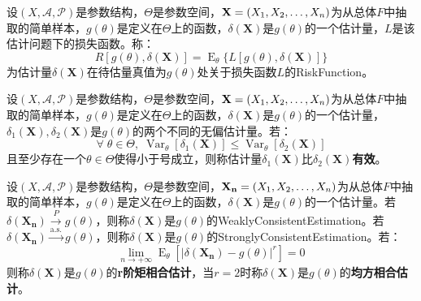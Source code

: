\begin{definition}
	设$(X,\mathscr{A},\mathscr{P})$是参数结构，$\Theta$是参数空间，$\mathbf{X}=(X_1, X_2, \dots, X_{n})$为从总体$F$中抽取的简单样本，$g(\theta)$是定义在$\Theta$上的函数，$\delta(\mathbf{X})$是$g(\theta)$的一个估计量，$L$是该估计问题下的损失函数。称：
	\begin{equation*}
		R[g(\theta),\delta(\mathbf{X})]=\operatorname{E}_{\theta}\{L[g(\theta),\delta(\mathbf{X})]\}
	\end{equation*}
	为估计量$\delta(\mathbf{X})$在待估量真值为$g(\theta)$处关于损失函数$L$的\gls{RiskFunction}。
\end{definition}
\begin{definition}
	设$(X,\mathscr{A},\mathscr{P})$是参数结构，$\Theta$是参数空间，$\mathbf{X}=(X_1, X_2, \dots, X_{n})$为从总体$F$中抽取的简单样本，$g(\theta)$是定义在$\Theta$上的函数，$\delta(\mathbf{X})$是$g(\theta)$的一个估计量，$\delta_1(\mathbf{X}),\delta_2(\mathbf{X})$是$g(\theta)$的两个不同的无偏估计量。若：
	\begin{equation*}
		\forall\;\theta\in\Theta,\;\operatorname{Var}_{\theta}[\delta_1(\mathbf{X})]\leqslant\operatorname{Var}_{\theta}[\delta_2(\mathbf{X})]
	\end{equation*}
	且至少存在一个$\theta\in\Theta$使得小于号成立，则称估计量$\delta_1(\mathbf{X})$比$\delta_2(\mathbf{X})$\textbf{有效}。
\end{definition}
\begin{definition}
	设$(X,\mathscr{A},\mathscr{P})$是参数结构，$\Theta$是参数空间，$\mathbf{X_n}=(X_1, X_2, \dots, X_{n})$为从总体$F$中抽取的简单样本，$g(\theta)$是定义在$\Theta$上的函数，$\delta(\mathbf{X})$是$g(\theta)$的一个估计量。若$\delta(\mathbf{X_n})\overset{P}{\longrightarrow}g(\theta)$，则称$\delta(\mathbf{X})$是$g(\theta)$的\gls{WeaklyConsistentEstimation}。若$\delta(\mathbf{X_n})\overset{\text{a.s.}}{\longrightarrow}g(\theta)$，则称$\delta(\mathbf{X})$是$g(\theta)$的\gls{StronglyConsistentEstimation}。若：
	\begin{equation*}
		\lim_{n\to+\infty}\operatorname{E}_{\theta}[|\delta(\mathbf{X_n})-g(\theta)|^r]=0
	\end{equation*}
	则称$\delta(\mathbf{X})$是$g(\theta)$的\textbf{r阶矩相合估计}，当$r=2$时称$\delta(\mathbf{X})$是$g(\theta)$的\textbf{均方相合估计}。
\end{definition}







